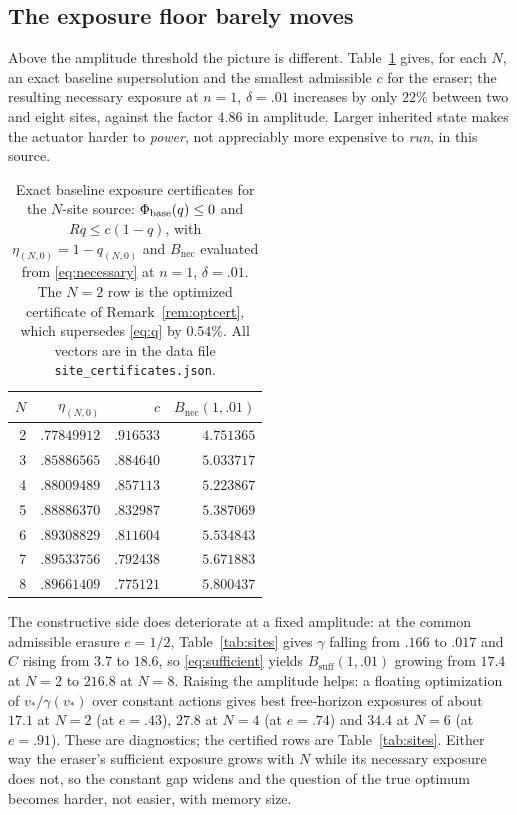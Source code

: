 \subsection{The exposure floor barely moves}
\label{sec:expN}

Above the amplitude threshold the picture is different. Table~\ref{tab:expN}
gives, for each $N$, an exact baseline supersolution and the smallest admissible
$c$ for the eraser; the resulting necessary exposure at $n=1$, $\delta=.01$
increases by only $22\%$ between two and eight sites, against the factor $4.86$
in amplitude. Larger inherited state makes the actuator harder to \emph{power},
not appreciably more expensive to \emph{run}, in this source.

\begin{table}[t]
\centering
\caption{Exact baseline exposure certificates for the $N$-site source:
$\Phi_{\mathrm{base}}(q)\le0$ and $Rq\le c(1-q)$, with $\eta_{(N,0)}=1-q_{(N,0)}$ and
$B_{\mathrm{nec}}$ evaluated from \eqref{eq:necessary} at $n=1$, $\delta=.01$.
The $N=2$ row is the optimized certificate of Remark~\ref{rem:optcert}, which
supersedes \eqref{eq:q} by $0.54\%$. All vectors are in
the data file \texttt{site\_certificates.json}.}
\label{tab:expN}
\begin{tabular}{rrrr}
\toprule
$N$ & $\eta_{(N,0)}$ & $c$ & $B_{\mathrm{nec}}(1,.01)$\\
\midrule
2 & $.77849912$ & $.916533$ & $4.751365$\\
3 & $.85886565$ & $.884640$ & $5.033717$\\
4 & $.88009489$ & $.857113$ & $5.223867$\\
5 & $.88886370$ & $.832987$ & $5.387069$\\
6 & $.89308829$ & $.811604$ & $5.534843$\\
7 & $.89533756$ & $.792438$ & $5.671883$\\
8 & $.89661409$ & $.775121$ & $5.800437$\\
\bottomrule
\end{tabular}
\end{table}

The constructive side does deteriorate at a fixed amplitude: at the common
admissible erasure $e=1/2$, Table~\ref{tab:sites} gives $\gamma$ falling from
$.166$ to $.017$ and $C$ rising from $3.7$ to $18.6$, so
\eqref{eq:sufficient} yields $B_{\mathrm{suff}}(1,.01)$ growing from $17.4$ at
$N=2$ to $216.8$ at $N=8$. Raising the amplitude helps: a floating optimization
of $v_*/\gamma(v_*)$ over constant actions gives best free-horizon exposures of
about $17.1$ at $N=2$ (at $e=.43$), $27.8$ at $N=4$ (at $e=.74$) and $34.4$ at
$N=6$ (at $e=.91$). These are diagnostics; the certified rows are
Table~\ref{tab:sites}. Either way the eraser's sufficient exposure grows with
$N$ while its necessary exposure does not, so the constant gap widens and the
question of the true optimum becomes harder, not easier, with memory size.

